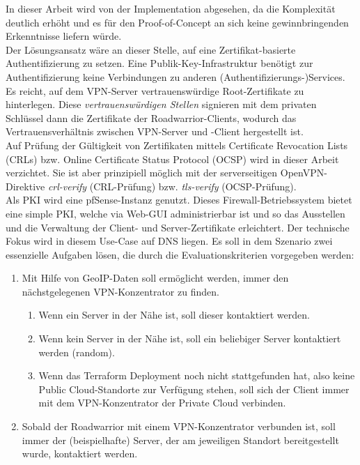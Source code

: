 In dieser Arbeit wird von der Implementation abgesehen, da die Komplexität deutlich erhöht und es für den Proof-of-Concept an sich keine gewinnbringenden Erkenntnisse liefern würde.\\
Der Lösungsansatz wäre an dieser Stelle, auf eine Zertifikat-basierte Authentifizierung zu setzen. Eine Publik-Key-Infrastruktur benötigt zur Authentifizierung keine Verbindungen zu anderen (Authentifizierungs-)Services. Es reicht, auf dem VPN-Server vertrauenswürdige Root-Zertifikate zu hinterlegen. Diese \textit{vertrauenswürdigen Stellen} signieren mit dem privaten Schlüssel dann die Zertifikate der \gls{Roadwarrior}-\gls{Client}s, wodurch das Vertrauensverhältnis zwischen VPN-Server und -\gls{Client} hergestellt ist.\\ 
Auf Prüfung der Gültigkeit von Zertifikaten mittels Certificate Revocation Lists (CRLs) bzw. Online Certificate Status Protocol (OCSP) wird in dieser Arbeit verzichtet. Sie ist aber prinzipiell möglich mit der serverseitigen OpenVPN-Direktive \textit{crl-verify} (CRL-Prüfung) bzw. \textit{tls-verify} (OCSP-Prüfung).\cite[S.116, S.325-327]{Keijser2011}\\
Als \gls{PKI} wird eine pfSense-Instanz genutzt. Dieses Firewall-Betriebssystem bietet eine simple \gls{PKI}, welche via Web-GUI administrierbar ist und so das Ausstellen und die Verwaltung der \gls{Client}- und Server-Zertifikate erleichtert.\cite[S.376-383]{Netgate2020}
Der technische Fokus wird in diesem Use-Case auf \gls{DNS} liegen. Es soll in dem Szenario zwei essenzielle Aufgaben lösen, die durch die Evaluationskriterien vorgegeben werden:\label{evalkriterien-uc2}
\begin{enumerate}
\item Mit Hilfe von \gls{GeoIP}-Daten soll ermöglicht werden, immer den nächstgelegenen \gls{VPN-Konzentrator} zu finden.\label{geoip-nearest-vpn}
\begin{enumerate}[label=(\alph*)]
    \item Wenn ein Server in der Nähe ist, soll dieser kontaktiert werden.\label{server-nearest}
    \item Wenn kein Server in der Nähe ist, soll ein beliebiger Server kontaktiert werden (random)\cite{bindrrset2020}.\label{no-server}
    \item Wenn das Terraform \gls{Deployment} noch nicht stattgefunden hat, also keine Public Cloud-Standorte zur Verfügung stehen, soll sich der \gls{Client} immer mit dem \gls{VPN-Konzentrator} der Private Cloud verbinden.\label{server-not-deployed}
\end{enumerate}
\item Sobald der \gls{Roadwarrior} mit einem \gls{VPN-Konzentrator} verbunden ist, soll immer der (beispielhafte) Server, der am jeweiligen Standort bereitgestellt wurde, kontaktiert werden.
\end{enumerate}

